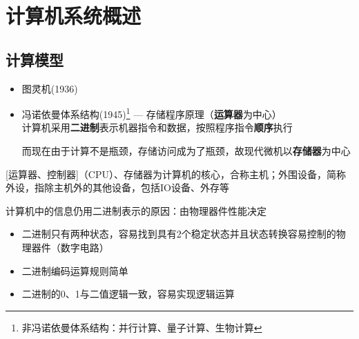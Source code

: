 
\section{计算机系统概述}
\subsection{计算模型}
\begin{itemize}
	\item 图灵机(1936)
	\item 冯诺依曼体系结构(1945)\footnote{非冯诺依曼体系结构：并行计算、量子计算、生物计算} --- 存储程序原理（\textbf{运算器}为中心）\\
	计算机采用\textbf{二进制}表示机器指令和数据，按照程序指令\textbf{顺序}执行
\begin{center}
\end{center}
而现在由于计算不是瓶颈，存储访问成为了瓶颈，故现代微机以\textbf{存储器}为中心
\begin{center}
\end{center}
\end{itemize}
[运算器、控制器]（CPU）、存储器为计算机的核心，合称主机；外围设备，简称外设，指除主机外的其他设备，包括IO设备、外存等

计算机中的信息仍用二进制表示的原因：由物理器件性能决定
\begin{itemize}
	\item 二进制只有两种状态，容易找到具有2个稳定状态并且状态转换容易控制的物理器件（数字电路）
	\item 二进制编码运算规则简单
	\item 二进制的0、1与二值逻辑一致，容易实现逻辑运算
\end{itemize}

